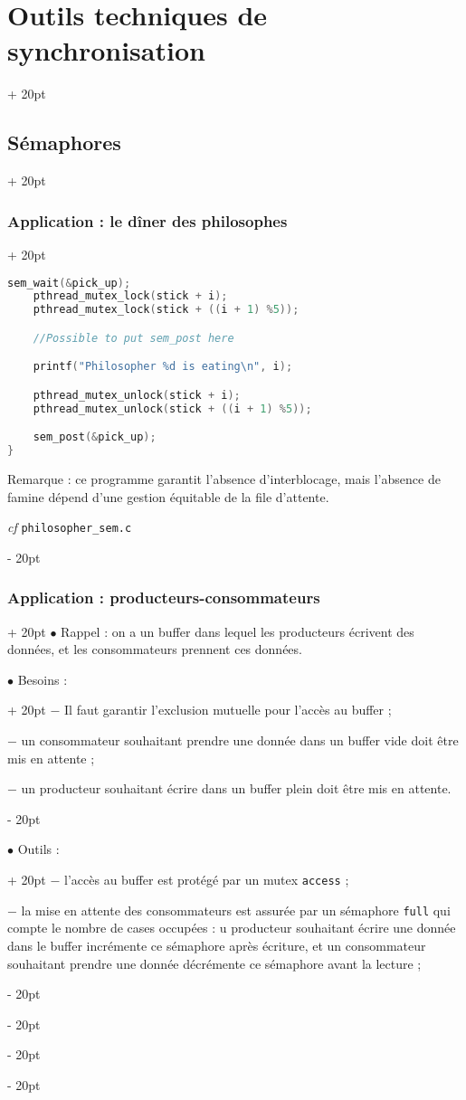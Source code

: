 \documentclass[a4paper, 12pt, twoside]{article}
\newcommand{\ind}[1][20pt]{\advance\leftskip + #1}
\newcommand{\deind}[1][20pt]{\advance\leftskip - #1}
\newenvironment{indt}[2][20pt]{#2 \par \ind[#1]}{\par \deind} %
\begin{document}
\begin{indt}{\section{Outils techniques de synchronisation}}
\begin{indt}{\subsection{Sémaphores}}
\begin{indt}{\subsubsection{Application : le dîner des philosophes}}
\begin{lstlisting}[language=C, xleftmargin=80pt]
    sem_wait(&pick_up);
    pthread_mutex_lock(stick + i);
    pthread_mutex_lock(stick + ((i + 1) %5));

    //Possible to put sem_post here

    printf("Philosopher %d is eating\n", i);

    pthread_mutex_unlock(stick + i);
    pthread_mutex_unlock(stick + ((i + 1) %5));

    sem_post(&pick_up);
}\end{lstlisting}

                Remarque : ce programme garantit l'absence d'interblocage, mais l'absence de famine dépend d'une gestion équitable de la file d'attente.

                \vspace{12pt}
                
                \textit{cf} \texttt{philosopher\_sem.c}
            \end{indt}

            \vspace{12pt}
            
            \begin{indt}{\subsubsection{Application : producteurs-consommateurs}}
                $\bullet$  Rappel : on a un buffer dans lequel les producteurs écrivent des données, et les consommateurs prennent ces données.

                \begin{indt}{$\bullet$ Besoins :}
                    $-$ Il faut garantir l'exclusion mutuelle pour l'accès au buffer ;

                    $-$ un consommateur souhaitant prendre une donnée dans un buffer vide doit être mis en attente ;

                    $-$ un producteur souhaitant écrire dans un buffer plein doit être mis en attente.
                \end{indt}

                \vspace{6pt}
                
                \begin{indt}{$\bullet$ Outils :}
                    $-$ l'accès au buffer est protégé par un mutex \texttt{access} ;

                    $-$ la mise en attente des consommateurs est assurée par un sémaphore \texttt{full} qui compte le nombre de cases occupées : u producteur souhaitant écrire une donnée dans le buffer incrémente ce sémaphore après écriture, et un consommateur souhaitant prendre une donnée décrémente ce sémaphore avant la lecture ;


\end{indt}
\end{indt}
\end{indt}
\end{indt}
\end{document}
